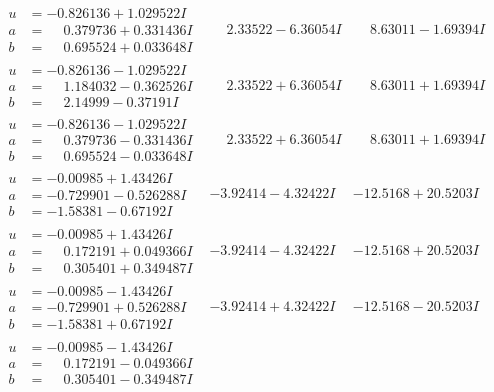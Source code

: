 \documentclass[1p]{elsarticle_modified}
\theoremstyle{definition}
\begin{document}
$$\begin{array}{c|c|c}
\begin{aligned}
u &= -0.826136 + 1.029522 I \\
a &= \phantom{-}0.379736 + 0.331436 I \\
b &= \phantom{-}0.695524 + 0.033648 I\end{aligned}
 & \phantom{-}2.33522 - 6.36054 I & \phantom{-}8.63011 - 1.69394 I \\ \hline\begin{aligned}
u &= -0.826136 - 1.029522 I \\
a &= \phantom{-}1.184032 - 0.362526 I \\
b &= \phantom{-}2.14999 - 0.37191 I\end{aligned}
 & \phantom{-}2.33522 + 6.36054 I & \phantom{-}8.63011 + 1.69394 I \\ \hline\begin{aligned}
u &= -0.826136 - 1.029522 I \\
a &= \phantom{-}0.379736 - 0.331436 I \\
b &= \phantom{-}0.695524 - 0.033648 I\end{aligned}
 & \phantom{-}2.33522 + 6.36054 I & \phantom{-}8.63011 + 1.69394 I \\ \hline\begin{aligned}
u &= -0.00985 + 1.43426 I \\
a &= -0.729901 - 0.526288 I \\
b &= -1.58381 - 0.67192 I\end{aligned}
 & -3.92414 - 4.32422 I & -12.5168 + 20.5203 I \\ \hline\begin{aligned}
u &= -0.00985 + 1.43426 I \\
a &= \phantom{-}0.172191 + 0.049366 I \\
b &= \phantom{-}0.305401 + 0.349487 I\end{aligned}
 & -3.92414 - 4.32422 I & -12.5168 + 20.5203 I \\ \hline\begin{aligned}
u &= -0.00985 - 1.43426 I \\
a &= -0.729901 + 0.526288 I \\
b &= -1.58381 + 0.67192 I\end{aligned}
 & -3.92414 + 4.32422 I & -12.5168 - 20.5203 I \\ \hline\begin{aligned}
u &= -0.00985 - 1.43426 I \\
a &= \phantom{-}0.172191 - 0.049366 I \\
b &= \phantom{-}0.305401 - 0.349487 I\end{aligned}

\end{array}$$
\end{document}
